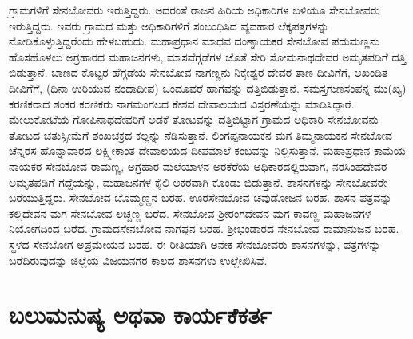 ಗ್ರಾಮಗಳಿಗೆ ಸೇನಬೋವರು ಇರುತ್ತಿದ್ದರು. ಅದರಂತೆ ರಾಜನ ಹಿರಿಯ ಅಧಿಕಾರಿಗಳ ಬಳಿಯೂ ಸೇನಬೋವರು ಇರುತ್ತಿದ್ದರು. ಇವರು ಗ್ರಾಮದ ಮತ್ತು ಅಧಿಕಾರಿಗಳಿಗೆ ಸಂಬಂಧಿಸಿದ ವ್ಯವಹಾರ ಲೆಕ್ಕಪತ್ರಗಳನ್ನು ನೋಡಿಕೊಳ್ಳುತ್ತಿದ್ದರೆಂದು ಹೇಳಬಹುದು. ಮಹಾಪ್ರಧಾನ ಮಾಧವ ದಂಣ್ನಾಯಕರ ಸೇನಬೋವ ಪದುಮಣ್ಣನು ಹೊಸಹೊಳಲು ಅಗ್ರಹಾರದ ಮಹಾಜನಗಳು, ಮಾಸವೆಗ್ಗಡೆಗಳ ಜೊತೆ ಸೇರಿ ಸೋಮನಾಥದೇವರ ಅಮೃತಪಡಿಗೆ ದತ್ತಿ ಬಿಡುತ್ತಾನೆ. ಬಾಣದ ಕೊಟ್ಟರ ಹೆಗ್ಗಡೆಯ ಸೇನಬೋವ ನಾಗಣ್ಣನು ನಿಕ್ಕೇಶ್ವರ ದೇವರ ತಾಣ ದೀವಿಗೆಗೆ, ಅಖಂಡಿತ ದೀವಿಗೆಗೆ, (ದಿನಾ ಉರಿಯುವ ನಂದಾದೀಪ) ಒಂದೂವರೆ ಹಾಗವನ್ನು ದತ್ತಿಬಿಡುತ್ತಾನೆ. ಸಮಸ್ತಗುಣಸಂಪನ್ನ ಮು(ಖ್ಯ) ಕರಣಿಕರಾದ ಶಂಕರ ಕರಣಿಕರು ನಾಗಮಂಗಲದ ಕೇಶವ ದೇವಾಲಯದ ವಿಸ್ತರಣೆಯನ್ನು ಮಾಡಿಸಿದ್ದಾರೆ. ಮೇಲುಕೋಟೆಯ ಗೋಪಿನಾಥದೇವರಿಗೆ ಅಡಕೆ ತೋಟವನ್ನು ದತ್ತಿಬಿಟ್ಟಾಗ ಗ್ರಾಮದ ಅಧಿಕಾರಿ ಸೇನಬೋವನು ತೋಟದ ಚತುಸ್ಸೀಮೆಗೆ ಶಂಖಚಕ್ರದ ಕಲ್ಲನ್ನು ನೆಡಿಸುತ್ತಾನೆ. ಲಿಂಗಪ್ಪನಾಯಕನ ಮಗ ತಿಮ್ಮನಾಯಕನ ಸೇನಬೋವ ಚೆನ್ನರಸ ಹೊನ್ನಾವಾರದ ಲಕ್ಷ್ಮೀಕಾಂತ ದೇವಾಲಯದ ದೀಪಮಾಲೆ ಕಂಬವನ್ನು ನಿಲ್ಲಿಸುತ್ತಾನೆ. ಮಹಾಪ್ರಧಾನ ಕಾಮೆಯ ನಾಯಕರ ಸೇನಬೋವ ರಾಮಣ್ಣ, ಅಗ್ರಹಾರ ಮಲೆಯಾಳನ ಅರಕೆರೆಯ ಅಧಿಕಾರದಲ್ಲಿರುವಾಗ, ನರಸಿಂಹದೇವರ ಅಮೃತಪಡಿಗೆ ಗದ್ದೆಯನ್ನು, ಮಹಾಜನಗಳ ಕೈಲಿ ಅಕರವಾಗಿ ಕೊಂಡು ಬಿಡುತ್ತಾನೆ. ಶಾಸನಗಳನ್ನು ಸೇನಬೋವರೇ ಬರೆಯುತ್ತಿದ್ದರು. ಸೇನಬೋವ ಬೊಮ್ಮಣ್ಣನ ಬರಹ. ಊರಸೇನಬೋವ ಚವುಡೋಜನ ಬರಹ. ಶಾಸನ ಪತ್ರವನ್ನು ಕಲ್ಲಿದೇವನ ಮಗ ಸೇನಬೋವ ಲಚ್ಚಣ್ಣ ಬರೆದ. ಸೇನಬೋವ ಶ‍್ರೀರಂಗದೇವನ ಮಗ ಕಾವಣ್ಣ ಮಹಾಜನಗಳ ನಿಯೋಗದಿಂದ ಬರೆದ. ಗ್ರಾಮದಸೇನಬೋವ ನಾಗಪ್ಪನ ಬರಹ. ಶ‍್ರೀಭಂಡಾರದ ಸೇನಬೋವ ರಾಮಾನುಜನ ಬರಹ. ಸ್ಥಳದ ಸೇನಬೋಗ ಅಪ್ರಮೇಯನ ಬರಹ. ಈ ರೀತಿ\-ಯಾಗಿ ಅನೇಕ ಸೇನಬೋವರು ಶಾಸನಗಳನ್ನು, ಪತ್ರಗಳನ್ನು ಬರೆದಿರುವುದನ್ನು ಜಿಲ್ಲೆಯ ವಿಜಯನಗರ ಕಾಲದ ಶಾಸನಗಳು ಉಲ್ಲೇಖಿಸಿವೆ.

\section*{ಬಲುಮನುಷ್ಯ ಅಥವಾ ಕಾರ್ಯಕೆಕರ್ತ}

